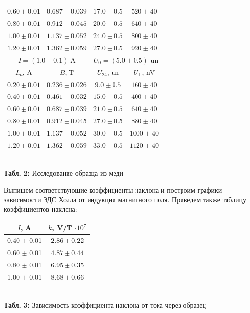 \documentclass[12pt,a4paper]{scrartcl}
\begin{document}
\begin{center}
\begin{tabular}{|c|c|c|c|}
			$0.60 \pm 0.01$ & $0.687 \pm 0.039$ & $17.0 \pm 0.5$ & $520 \pm 40$
			\\\hline
			$0.80 \pm 0.01$ & $0.912 \pm 0.045$ & $20.0 \pm 0.5$ & $640 \pm 40$
			\\\hline
			$1.00 \pm 0.01$ & $1.137 \pm 0.052$ & $24.0 \pm 0.5$ & $800 \pm 40$
			\\\hline
			$1.20 \pm 0.01$ & $1.362 \pm 0.059$ & $27.0 \pm 0.5$ & $920 \pm 40$
			\\\hline
			\multicolumn{2}{|c|}{$I = (1.0 \pm 0.1)$ A} & \multicolumn{2}{|c|}{$U_0 = (5.0 \pm 0.5)$ un}
			\\\hline
			$I_m$, A & $B$, T & $U_{24}$, un & $U_\perp$, nV
			\\\hline
			$0.20 \pm 0.01$ & $0.236 \pm 0.026$ & $9.0 \pm 0.5$ & $160 \pm 40$
			\\\hline
			$0.40 \pm 0.01$ & $0.461 \pm 0.032$ & $15.0 \pm 0.5$ & $400 \pm 40$
			\\\hline
			$0.60 \pm 0.01$ & $0.687 \pm 0.039$ & $21.0 \pm 0.5$ & $640 \pm 40$
			\\\hline
			$0.80 \pm 0.01$ & $0.912 \pm 0.045$ & $27.0 \pm 0.5$ & $880 \pm 40$
			\\\hline
			$1.00 \pm 0.01$ & $1.137 \pm 0.052$ & $30.0 \pm 0.5$ & $1000 \pm 40$
			\\\hline
			$1.20 \pm 0.01$ & $1.362 \pm 0.059$ & $33.0 \pm 0.5$ & $1120 \pm 40$
			\\\hline
		\end{tabular}
		\\\textbf{Табл. 2:} Исследование образца из меди
	\end{center}

	Выпишем соответствующие коэффициенты наклона и построим графики зависимости ЭДС Холла от индукции магнитного поля. Приведем также таблицу коэффициентов наклона:
	
	\begin{center}
		\begin{tabular}{|c|c|}
			\hline
			$I$, A & $k$, V/T $\cdot 10^{7}$
			\\\hline
			0.40 $\pm$ 0.01 & $2.86 \pm 0.22$
			\\\hline
			0.60 $\pm$ 0.01 & $4.87 \pm 0.44$
			\\\hline
			0.80 $\pm$ 0.01 & $6.95 \pm 0.35$
			\\\hline
			1.00 $\pm$ 0.01 & $8.68 \pm 0.66$
			\\\hline
		\end{tabular}
		\\\textbf{Табл. 3:} Зависимость коэффициента наклона от тока через образец
	\end{center}
	
\end{document}
